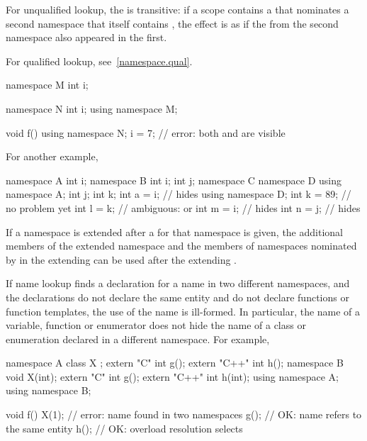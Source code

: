 \pnum
For unqualified lookup, the
 is transitive: if a scope contains a
 that nominates a second namespace that itself
contains , the effect is as if the
 from the second namespace also appeared in
the first.
\begin{note} For qualified lookup, see~\ref{namespace.qual}. \end{note}
\begin{example}

\begin{codeblock}
namespace M {
  int i;
}

namespace N {
  int i;
  using namespace M;
}

void f() {
  using namespace N;
  i = 7;            // error: both  and  are visible
}
\end{codeblock}

For another example,

\begin{codeblock}
namespace A {
  int i;
}
namespace B {
  int i;
  int j;
  namespace C {
    namespace D {
      using namespace A;
      int j;
      int k;
      int a = i;    //  hides 
    }
    using namespace D;
    int k = 89;     // no problem yet
    int l = k;      // ambiguous:  or 
    int m = i;      //  hides 
    int n = j;      //  hides 
  }
}
\end{codeblock}
\end{example}


\pnum
If a namespace is extended after a
 for that namespace is given, the additional
members of the extended namespace and the members of namespaces
nominated by  in the
extending  can be used after the
extending .

\pnum
\begin{note}
If name lookup finds a declaration for a name in two different
namespaces, and the declarations do not declare the same entity and do
not declare functions or function templates, the use of the name is ill-formed.
In particular, the name of a variable, function or enumerator does not
hide the name of a class or enumeration declared in a different
namespace. For example,

\begin{codeblock}
namespace A {
  class X { };
  extern "C"   int g();
  extern "C++" int h();
}
namespace B {
  void X(int);
  extern "C"   int g();
  extern "C++" int h(int);
}
using namespace A;
using namespace B;

void f() {
  X(1);             // error: name  found in two namespaces
  g();              // OK: name  refers to the same entity
  h();              // OK: overload resolution selects 
}
\end{codeblock}
\end{note}

